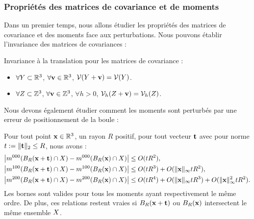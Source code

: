 \subsubsection{Propriétés des matrices de covariance et de moments}
%
Dans un premier temps, nous allons étudier les propriétés des matrices de
covariance et des moments face aux perturbations. Nous pouvons
établir l'invariance des matrices de covariances :
%
\begin{lemma} \label{lem:covariance-translation-invariant}
%
  Invariance à la translation pour les matrices de covariance :
%
  \begin{itemize}
    \item $\forall Y \subset \mathbb{R}^3$, $\forall \mathbf{v} \in \mathbb{R}^3$, $\mathcal{V}(Y + \mathbf{v}) = \mathcal{V}(Y)$.
    \item $\forall Z \subset \mathbb{Z}^3$, $\forall \mathbf{v} \in \mathbb{Z}^3$, $\forall h > 0$, $\mathcal{V}_{h}(Z + \mathbf{v}) = \mathcal{V}_{h}(Z)$.
  \end{itemize}
%
\end{lemma}
%
Nous devons également étudier comment les moments sont perturbés par une erreur de positionnement de la boule :
%
\begin{lemma} \label{lem:moments-ball-position-error}
%
  Pour tout point $\mathbf{x} \in \mathbb{R}^3$, un rayon $R$
  positif, pour tout vecteur $\mathbf{t}$ avec pour norme $t := \| \mathbf{t} \|_2 \le R$,
  nous avons :
%
  \begin{align}
    \left| m^{000}(B_{R}(\mathbf{x} + \mathbf{t}) \cap X) - m^{000}(B_{R}(\mathbf{x}) \cap X) \right|
    & \le O(t R^2), \label{eq:zero-moments-ball-position-error} \\
    \left| m^{100}(B_{R}(\mathbf{x} + \mathbf{t}) \cap X) - m^{100}(B_{R}(\mathbf{x}) \cap X) \right|
    & \le O(t R^3) + O( \|\mathbf{x}\|_\infty t R^2 ), \label{eq:first-moments-ball-position-error}\\
    \left| m^{200}(B_{R}(\mathbf{x} + \mathbf{t}) \cap X) - m^{200}(B_{R}(\mathbf{x}) \cap X) \right|
    & \le O(t R^4) + O( \|\mathbf{x}\|_\infty t R^3 ) + O( \|\mathbf{x}\|^2_\infty t R^2 ). \label{eq:second-moments-ball-position-error}
  \end{align}
%
  Les bornes sont valides pour tous les moments ayant respectivement le même
  ordre. De plus, ces relations restent vraies si $B_{R}(\mathbf{x}+\mathbf{t})$ ou
  $B_{R}(\mathbf{x})$ intersectent le même ensemble $X$.
%
\end{lemma}
